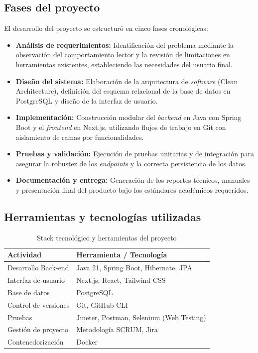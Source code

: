 \documentclass[12pt, atypical, journal]{article}
\begin{document}
\subsection{Fases del proyecto}
El desarrollo del proyecto se estructuró en cinco fases cronológicas:
\begin{itemize}
    \item \textbf{Análisis de requerimientos:} Identificación del problema mediante la observación del comportamiento lector y la revisión de limitaciones en herramientas existentes, estableciendo las necesidades del usuario final.
    \item \textbf{Diseño del sistema:} Elaboración de la arquitectura de \textit{software} (Clean Architecture), definición del esquema relacional de la base de datos en PostgreSQL y diseño de la interfaz de usuario.
    \item \textbf{Implementación:} Construcción modular del \textit{backend} en Java con Spring Boot y el \textit{frontend} en Next.js, utilizando flujos de trabajo en Git con aislamiento de ramas por funcionalidades.
    \item \textbf{Pruebas y validación:} Ejecución de pruebas unitarias y de integración para asegurar la robustez de los \textit{endpoints} y la correcta persistencia de los datos.
    \item \textbf{Documentación y entrega:} Generación de los reportes técnicos, manuales y presentación final del producto bajo los estándares académicos requeridos.
\end{itemize}

\subsection{Herramientas y tecnologías utilizadas}

\begin{table}[h]
\centering
\caption{Stack tecnológico y herramientas del proyecto}
\label{tab:tecnologias}
\begin{tabular}{ll}
\toprule
\textbf{Actividad} & \textbf{Herramienta / Tecnología} \\
\midrule
Desarrollo Back-end & Java 21, Spring Boot, Hibernate, JPA \\
Interfaz de usuario & Next.js, React, Tailwind CSS \\
Base de datos & PostgreSQL \\
Control de versiones & Git, GitHub CLI \\
Pruebas & Jmeter, Postman, Selenium (Web Testing) \\
Gestión de proyecto & Metodología SCRUM, Jira \\
Contenedorización & Docker \\
\bottomrule
\end{tabular}
\end{table}
\end{document}
